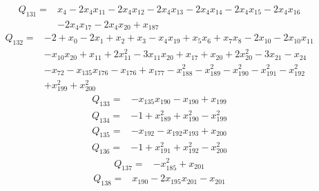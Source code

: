 \begin{equation*}\begin{aligned}
Q_{131}={}& x_{4}-2x_{4}x_{11}-2x_{4}x_{12}-2x_{4}x_{13}-2x_{4}x_{14}-2x_{4}x_{15}-2x_{4}x_{16}\\
& -2x_{4}x_{17}-2x_{4}x_{20}+x_{187}
\end{aligned}\end{equation*}
\begin{equation*}\begin{aligned}
Q_{132}={}& -2+x_{0}-2x_{1}+x_{2}+x_{3}-x_{4}x_{19}+x_{5}x_{6}+x_{7}x_{8}-2x_{10}-2x_{10}x_{11}\\
& -x_{10}x_{20}+x_{11}+2x_{11}^{2}-3x_{11}x_{20}+x_{17}+x_{20}+2x_{20}^{2}-3x_{21}-x_{24}\\
& -x_{72}-x_{135}x_{176}-x_{176}+x_{177}-x_{188}^{2}-x_{189}^{2}-x_{190}^{2}-x_{191}^{2}-x_{192}^{2}\\
& +x_{199}^{2}+x_{200}^{2}
\end{aligned}\end{equation*}
\begin{equation*}\begin{aligned}
Q_{133}={}& -x_{135}x_{190}-x_{190}+x_{199}
\end{aligned}\end{equation*}
\begin{equation*}\begin{aligned}
Q_{134}={}& -1+x_{189}^{2}+x_{190}^{2}-x_{199}^{2}
\end{aligned}\end{equation*}
\begin{equation*}\begin{aligned}
Q_{135}={}& -x_{192}-x_{192}x_{193}+x_{200}
\end{aligned}\end{equation*}
\begin{equation*}\begin{aligned}
Q_{136}={}& -1+x_{191}^{2}+x_{192}^{2}-x_{200}^{2}
\end{aligned}\end{equation*}
\begin{equation*}\begin{aligned}
Q_{137}={}& -x_{185}^{2}+x_{201}
\end{aligned}\end{equation*}
\begin{equation*}\begin{aligned}
Q_{138}={}& x_{190}-2x_{195}x_{201}-x_{201}
\end{aligned}\end{equation*}
